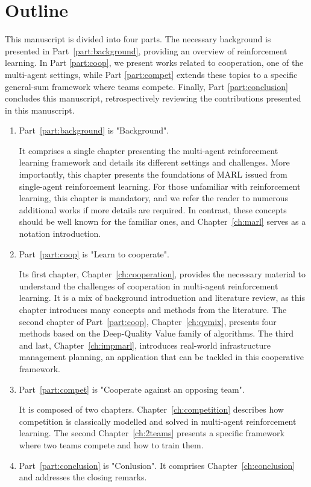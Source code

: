
\section{Outline}
\label{sec:ch1_outline}
This manuscript is divided into four parts.
The necessary background is presented in Part~\ref{part:background}, providing an overview of reinforcement learning.
In Part \ref{part:coop}, we present works related to cooperation, one of the multi-agent settings, while Part \ref{part:compet} extends these topics to a specific general-sum framework where teams compete.
Finally, Part \ref{part:conclusion} concludes this manuscript, retrospectively reviewing the contributions presented in this manuscript.

\begin{enumerate}
    \item Part~\ref{part:background} is "Background".
    
    It comprises a single chapter presenting the multi-agent reinforcement learning framework and details its different settings and challenges.
    More importantly, this chapter presents the foundations of MARL issued from single-agent reinforcement learning.
    For those unfamiliar with reinforcement learning, this chapter is mandatory, and we refer the reader to numerous additional works if more details are required.
    In contrast, these concepts should be well known for the familiar ones, and Chapter~\ref{ch:marl} serves as a notation introduction.

    \item Part~\ref{part:coop} is "Learn to cooperate".
    
    Its first chapter, Chapter~\ref{ch:cooperation}, provides the necessary material to understand the challenges of cooperation in multi-agent reinforcement learning.
    It is a mix of background introduction and literature review, as this chapter introduces many concepts and methods from the literature.
    The second chapter of Part~\ref{part:coop}, Chapter~\ref{ch:qvmix}, presents four methods based on the Deep-Quality Value family of algorithms.
    The third and last, Chapter~\ref{ch:impmarl}, introduces real-world infrastructure management planning, an application that can be tackled in this cooperative framework.
    
    \item Part~\ref{part:compet} is "Cooperate against an opposing team".
    
    It is composed of two chapters.
    Chapter~\ref{ch:competition} describes how competition is classically modelled and solved in multi-agent reinforcement learning.
    The second Chapter~\ref{ch:2teams} presents a specific framework where two teams compete and how to train them.

    \item Part~\ref{part:conclusion} is "Conlusion".
    It comprises Chapter~\ref{ch:conclusion} and addresses the closing remarks.
\end{enumerate}

